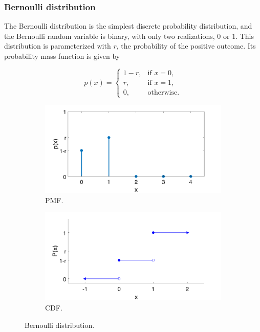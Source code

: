 \subsubsection{Bernoulli distribution}

The Bernoulli distribution is the simplest discrete probability
distribution, and the Bernoulli random variable is binary, with only
two realizations, $0$ or $1$. This distribution is parameterized with 
$r$, the probability of the positive outcome. Its probability mass 
function is given by

$$
p(x) = \begin{cases}
 1 - r, & \text{if } x = 0, \\
     r, & \text{if } x = 1, \\
     0, & \text{otherwise}.
\end{cases}
$$

\begin{figure}
\centering
\begin{subfigure}{.5\textwidth}
  \centering
  \includegraphics[width=.9\linewidth]{figures/bern.pmf.png}
  \caption{PMF.}
  \label{fig:bern:pmf}
\end{subfigure}%
\begin{subfigure}{.5\textwidth}
  \centering
  \includegraphics[width=.9\linewidth]{figures/bern.cdf.png}
  \caption{CDF.}
  \label{fig:bern:cdf}
\end{subfigure}
\caption{Bernoulli distribution.}
\label{fig:bern}
\end{figure}

